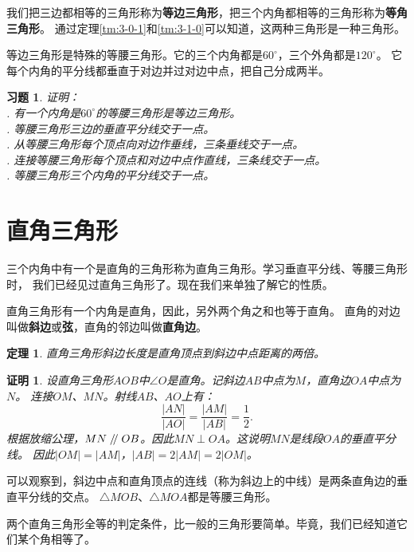 \documentclass[12pt,UTF8]{ctexbook}
\newtheorem{tm}{定理}[section]
\newtheorem*{proof2}{证明}
\newtheorem{xt}{习题}[section]
\renewcommand\parallel{\mathrel{/\mskip-4mu/}}
\begin{document}
我们把三边都相等的三角形称为\textbf{等边三角形}，把三个内角都相等的三角形称为\textbf{等角三角形}。
通过定理\ref{tm:3-0-1}和\ref{tm:3-1-0}可以知道，这两种三角形是一种三角形。

等边三角形是特殊的等腰三角形。它的三个内角都是$60^\circ$，三个外角都是$120^\circ$。
它每个内角的平分线都垂直于对边并过对边中点，把自己分成两半。

\begin{xt}\label{xt:4-0-0}
    证明：\\
    . 有一个内角是$60^\circ$的等腰三角形是等边三角形。\\
    . 等腰三角形三边的垂直平分线交于一点。\\
    . 从等腰三角形每个顶点向对边作垂线，三条垂线交于一点。\\
    . 连接等腰三角形每个顶点和对边中点作直线，三条线交于一点。\\
    . 等腰三角形三个内角的平分线交于一点。
\end{xt}

\section{直角三角形}
三个内角中有一个是直角的三角形称为直角三角形。学习垂直平分线、等腰三角形时，
我们已经见过直角三角形了。现在我们来单独了解它的性质。

直角三角形有一个内角是直角，因此，另外两个角之和也等于直角。
直角的对边叫做\textbf{斜边}或\textbf{弦}，直角的邻边叫做\textbf{直角边}。

\begin{tm}\label{tm:4-1-0}
    直角三角形斜边长度是直角顶点到斜边中点距离的两倍。
\end{tm}
\begin{proof2}
    设直角三角形$AOB$中$\angle O$是直角。记斜边$AB$中点为$M$，直角边$OA$中点为$N$。
    连接$OM$、$MN$。射线$AB$、$AO$上有：
    $$ \frac{|AN|}{|AO|} = \frac{|AM|}{|AB|} = \frac12.$$
    根据放缩公理，$MN \parallel OB$。因此$MN \perp OA$。这说明$MN$是线段$OA$的垂直平分线。
    因此$|OM| = |AM|$，$|AB| = 2|AM| = 2|OM|$。
\end{proof2}
可以观察到，斜边中点和直角顶点的连线（称为斜边上的中线）是两条直角边的垂直平分线的交点。
$\triangle MOB$、$\triangle MOA$都是等腰三角形。

两个直角三角形全等的判定条件，比一般的三角形要简单。毕竟，我们已经知道它们某个角相等了。
\end{document}
